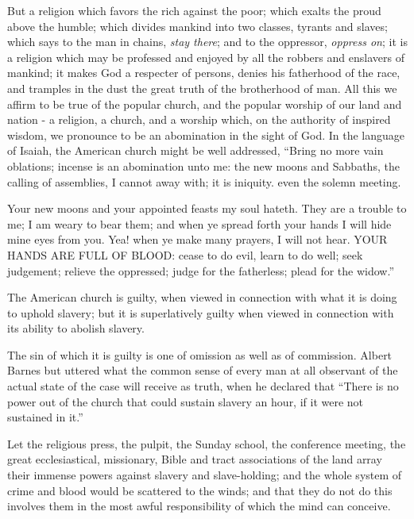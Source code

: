 But a religion which favors the rich against the poor; which exalts the proud above the humble; which divides mankind into two classes, tyrants and slaves; which says to the man in chains, \textit{stay there}; and to the oppressor, \textit{oppress on}; it is a religion which may be professed and enjoyed by all the robbers and enslavers of mankind; it makes God a respecter of persons, denies his fatherhood of the race, and tramples in the dust the great truth of the brotherhood of man. All this we affirm to be true of the popular church, and the popular worship of our land and nation - a religion, a church, and a worship which, on the authority of inspired wisdom, we pronounce to be an abomination in the sight of God. In the language of Isaiah, the American church might be well addressed, “Bring no more vain oblations; incense is an abomination unto me: the new moons and Sabbaths, the calling of assemblies, I cannot away with; it is iniquity. even the solemn meeting.\par

Your new moons and your appointed feasts my soul hateth. They are a trouble to me; I am weary to bear them; and when ye spread forth your hands I will hide mine eyes from you. Yea! when ye make many prayers, I will not hear. YOUR HANDS ARE FULL OF BLOOD: cease to do evil, learn to do well; seek judgement; relieve the oppressed; judge for the fatherless; plead for the widow.”\par

The American church is guilty, when viewed in connection with what it is doing to uphold slavery; but it is superlatively guilty when viewed in connection with its ability to abolish slavery.\par

The sin of which it is guilty is one of omission as well as of commission. Albert Barnes but uttered what the common sense of every man at all observant of the actual state of the case will receive as truth, when he declared that “There is no power out of the church that could sustain slavery an hour, if it were not sustained in it.”\par

Let the religious press, the pulpit, the Sunday school, the conference meeting, the great ecclesiastical, missionary, Bible and tract associations of the land array their immense powers against slavery and slave-holding; and the whole system of crime and blood would be scattered to the winds; and that they do not do this involves them in the most awful responsibility of which the mind can conceive.\par

